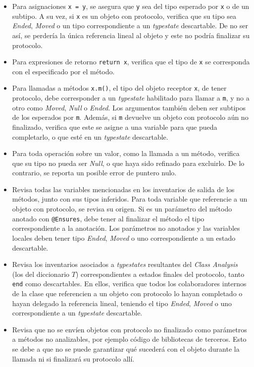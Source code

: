 \begin{itemize}
    \item Para asignaciones \texttt{x = y}, se asegura que \texttt{y} sea del tipo esperado por \texttt{x} o de un subtipo. A su vez, si \texttt{x} es un objeto con protocolo, verifica que su tipo sea \textit{Ended}, \textit{Moved} o un tipo correspondiente a un \textit{typestate} descartable. De no ser así, se perdería la única referencia lineal al objeto y este no podría finalizar su protocolo.
    \item Para expresiones de retorno \texttt{return x}, verifica que el tipo de \texttt{x} se corresponda con el especificado por el método.
    \item Para llamadas a métodos \texttt{x.m()}, el tipo del objeto receptor \texttt{x}, de tener protocolo, debe corresponder a un \textit{typestate} habilitado para llamar a \texttt{m}, y no a otro como \textit{Moved}, \textit{Null} o \textit{Ended}. Los argumentos también deben ser subtipos de los esperados por \texttt{m}. Además, si \texttt{m} devuelve un objeto con protocolo aún no finalizado, verifica que este se asigne a una variable para que pueda completarlo, o que esté en un \textit{typestate} descartable.
    \item Para toda operación sobre un valor, como la llamada a un método, verifica que su tipo no pueda ser \textit{Null}, o que haya sido refinado para excluirlo. De lo contrario, se reporta un posible error de puntero nulo.
    \item Revisa todas las variables mencionadas en los inventarios de salida de los métodos, junto con sus tipos inferidos. Para toda variable que referencie a un objeto con protocolo, se revisa su origen. Si es un parámetro del método anotado con \texttt{@Ensures}, debe tener al finalizar el método el tipo correspondiente a la anotación. Los parámetros no anotados y las variables locales deben tener tipo \textit{Ended}, \textit{Moved} o uno correspondiente a un estado descartable.
    \item Revisa los inventarios asociados a \textit{typestates} resultantes del \textit{Class Analysis} (los del diccionario $T$) correspondientes a estados finales del protocolo, tanto \texttt{end} como descartables. En ellos, verifica que todos los colaboradores internos de la clase que referencien a un objeto con protocolo lo hayan completado o hayan delegado la referencia lineal, teniendo el tipo \textit{Ended}, \textit{Moved} o uno correspondiente a un \textit{typestate} descartable.
    \item Revisa que no se envíen objetos con protocolo no finalizado como parámetros a métodos no analizables, por ejemplo código de bibliotecas de terceros. Esto se debe a que no se puede garantizar qué sucederá con el objeto durante la llamada ni si finalizará su protocolo allí.
\end{itemize}

